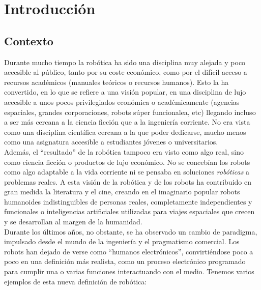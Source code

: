 \chapter{Introducción}\label{cap:introduccion}

\section{Contexto}\label{sec:contextoIntroduccion}
Durante mucho tiempo la robótica ha sido una disciplina muy alejada y poco accesible al público, tanto por su coste económico, como por el difícil acceso a recursos académicos (manuales teóricos o recursos humanos). Esto la ha convertido, en lo que se refiere a una visión popular, en una disciplina de lujo accesible a unos pocos privilegiados económica o académicamente (agencias espaciales, grandes corporaciones, robots súper funcionalea, etc) llegando incluso a ser más cercana a la ciencia ficción que a la ingeniería corriente. No era vista como una disciplina científica cercana a la que poder dedicarse, mucho menos como una asignatura accesible a estudiantes jóvenes o universitarios. \\
Además, el  ``resultado'' de la robótica tampoco era visto como algo real, sino como ciencia ficción o productos de lujo económico. No se concebían los robots como algo adaptable a la vida corriente ni se pensaba en soluciones \textit{robóticas} a problemas reales. A esta visión de la robótica y de los robots ha contribuido en gran medida la literatura y el cine, creando en el imaginario popular robots humanoides indistinguibles de personas reales, completamente independientes y funcionales o inteligencias artificiales utilizadas para viajes espaciales que crecen y se desarrollan al margen de la humanidad.\\

Durante los últimos años, no obstante, se ha observado un cambio de paradigma, impulsado desde el mundo de la ingeniería y el pragmatismo comercial. Los robots han dejado de verse como ``humanos electrónicos'', convirtiéndose poco a poco en una definición más realista, como un proceso electrónico programado para cumplir una o varias funciones interactuando con el medio. Tenemos varios ejemplos de esta nueva definición de robótica:

